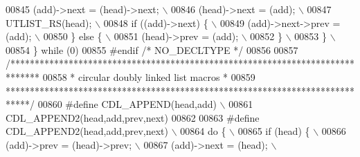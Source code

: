 \begin{DoxyCode}
00845 \textcolor{preprocessor}{    (add)->next = (head)->next;                                                                \(\backslash\)}
00846 \textcolor{preprocessor}{    (head)->next = (add);                                                                      \(\backslash\)}
00847 \textcolor{preprocessor}{    UTLIST\_RS(head);                                                                           \(\backslash\)}
00848 \textcolor{preprocessor}{    if ((add)->next) \{                                                                         \(\backslash\)}
00849 \textcolor{preprocessor}{      (add)->next->prev = (add);                                                               \(\backslash\)}
00850 \textcolor{preprocessor}{    \} else \{                                                                                   \(\backslash\)}
00851 \textcolor{preprocessor}{      (head)->prev = (add);                                                                    \(\backslash\)}
00852 \textcolor{preprocessor}{    \}                                                                                          \(\backslash\)}
00853 \textcolor{preprocessor}{  \}                                                                                            \(\backslash\)}
00854 \textcolor{preprocessor}{\} while (0)}
00855 \textcolor{preprocessor}{#endif }\textcolor{comment}{/* NO\_DECLTYPE */}\textcolor{preprocessor}{}
00856 
00857 \textcolor{comment}{/******************************************************************************}
00858 \textcolor{comment}{ * circular doubly linked list macros                                         *}
00859 \textcolor{comment}{ *****************************************************************************/}
00860 \textcolor{preprocessor}{#define CDL\_APPEND(head,add)                                                                   \(\backslash\)}
00861 \textcolor{preprocessor}{    CDL\_APPEND2(head,add,prev,next)}
00862 
00863 \textcolor{preprocessor}{#define CDL\_APPEND2(head,add,prev,next)                                                        \(\backslash\)}
00864 \textcolor{preprocessor}{do \{                                                                                           \(\backslash\)}
00865 \textcolor{preprocessor}{ if (head) \{                                                                                   \(\backslash\)}
00866 \textcolor{preprocessor}{   (add)->prev = (head)->prev;                                                                 \(\backslash\)}
00867 \textcolor{preprocessor}{   (add)->next = (head);                                                                       \(\backslash\)}

\end{DoxyCode}
